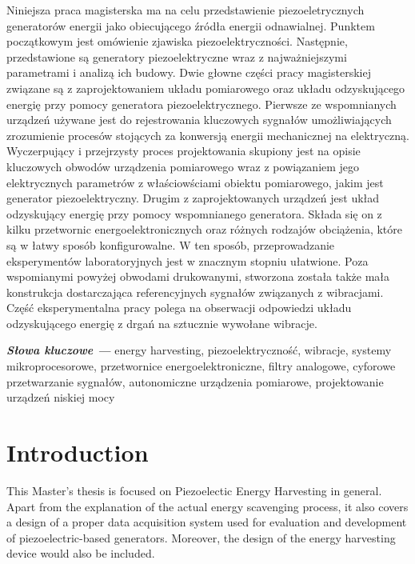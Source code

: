 \documentclass[12pt,a4paper]{article}
\providecommand{\slowakluczowe}[1]
{
  \small	
  \textbf{\textit{Słowa kluczowe ---}} #1
}
\begin{document}
Niniejsza praca magisterska ma na celu przedstawienie piezoeletrycznych generatorów energii jako obiecującego źródła energii odnawialnej. Punktem początkowym jest omówienie zjawiska piezoelektryczności. Następnie, przedstawione są generatory piezoelektryczne wraz z najważniejszymi parametrami i analizą ich budowy. Dwie głowne części pracy magisterskiej związane są z zaprojektowaniem układu pomiarowego oraz układu odzyskującego energię przy pomocy generatora piezoelektrycznego. Pierwsze ze wspomnianych urządzeń używane jest do rejestrowania kluczowych sygnałów umożliwiających zrozumienie procesów stojących za konwersją energii mechanicznej na elektryczną. Wyczerpujący i przejrzysty proces projektowania skupiony jest na opisie kluczowych obwodów urządzenia pomiarowego wraz z powiązaniem jego elektrycznych parametrów z właściowściami obiektu pomiarowego, jakim jest generator piezoelektryczny. Drugim z zaprojektowanych urządzeń jest układ odzyskujący energię przy pomocy wspomnianego generatora. Składa się on z kilku przetwornic energoelektronicznych oraz różnych rodzajów obciążenia, które są w łatwy sposób konfigurowalne. W ten sposób, przeprowadzanie eksperymentów laboratoryjnych jest w znacznym stopniu ułatwione. Poza wspomianymi powyżej obwodami drukowanymi, stworzona została także mała konstrukcja dostarczająca referencyjnych sygnałów związanych z wibracjami. Część eksperymentalna pracy polega na obserwacji odpowiedzi układu odzyskującego energię z drgań na sztucznie wywołane wibracje.

\par

\hspace{10pt}

\slowakluczowe{energy harvesting, piezoelektryczność, wibracje, systemy mikroprocesorowe, przetwornice energoelektroniczne, filtry analogowe, cyforowe przetwarzanie sygnałów, autonomiczne urządzenia pomiarowe, projektowanie urządzeń niskiej mocy}

\clearpage
\tableofcontents
\clearpage

\newpage\null\thispagestyle{empty}\newpage


\section{Introduction}
This Master's thesis is focused on Piezoelectic Energy Harvesting in general. Apart from the explanation of the actual energy scavenging process, it also covers a design of a proper data acquisition system used for evaluation and development of piezoelectric-based generators. Moreover, the design of the energy harvesting device would also be included.
\par
\end{document}
